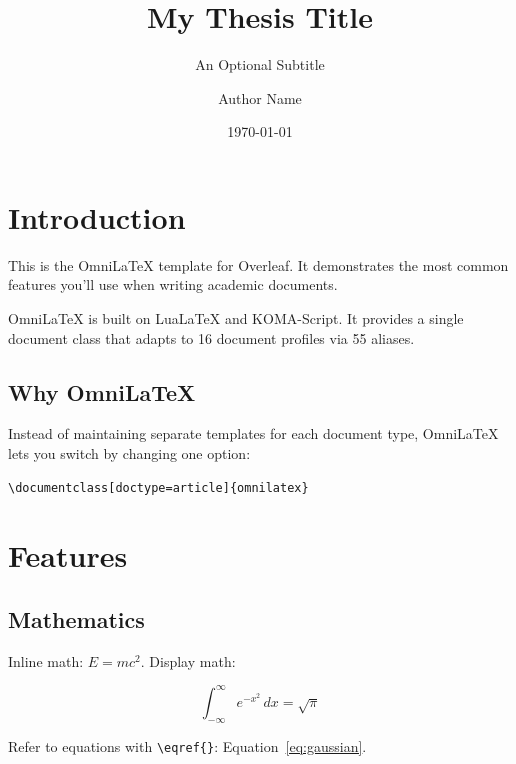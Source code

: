 \documentclass[
  doctype=thesis,
  language=english,
  institution=none,
]{omnilatex}
\title{My Thesis Title}
\subtitle{An Optional Subtitle}
\author{Author Name}
\date{\today}
\begin{document}
\maketitle
\tableofcontents


\chapter{Introduction}

This is the OmniLaTeX template for Overleaf. It demonstrates the
most common features you'll use when writing academic documents.

OmniLaTeX is built on LuaLaTeX and KOMA-Script. It provides a single
document class that adapts to 16 document profiles via 55 aliases.

\section{Why OmniLaTeX}

Instead of maintaining separate templates for each document type,
OmniLaTeX lets you switch by changing one option:

\begin{verbatim}
\documentclass[doctype=article]{omnilatex}
\end{verbatim}


\chapter{Features}

\section{Mathematics}

Inline math: $E = mc^2$. Display math:

\begin{equation}
  \int_{-\infty}^{\infty} e^{-x^2} \, dx = \sqrt{\pi}
  \label{eq:gaussian}
\end{equation}

Refer to equations with \verb|\eqref{}|: Equation~\eqref{eq:gaussian}.
\end{document}
